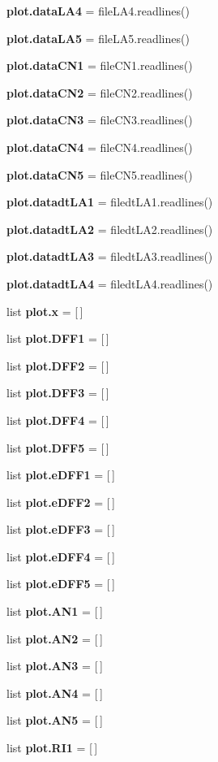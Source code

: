 \begin{DoxyCompactItemize}
\textbf{ plot.\+data\+L\+A4} = file\+L\+A4.\+readlines()
\item 
\textbf{ plot.\+data\+L\+A5} = file\+L\+A5.\+readlines()
\item 
\textbf{ plot.\+data\+C\+N1} = file\+C\+N1.\+readlines()
\item 
\textbf{ plot.\+data\+C\+N2} = file\+C\+N2.\+readlines()
\item 
\textbf{ plot.\+data\+C\+N3} = file\+C\+N3.\+readlines()
\item 
\textbf{ plot.\+data\+C\+N4} = file\+C\+N4.\+readlines()
\item 
\textbf{ plot.\+data\+C\+N5} = file\+C\+N5.\+readlines()
\item 
\textbf{ plot.\+datadt\+L\+A1} = filedt\+L\+A1.\+readlines()
\item 
\textbf{ plot.\+datadt\+L\+A2} = filedt\+L\+A2.\+readlines()
\item 
\textbf{ plot.\+datadt\+L\+A3} = filedt\+L\+A3.\+readlines()
\item 
\textbf{ plot.\+datadt\+L\+A4} = filedt\+L\+A4.\+readlines()
\item 
list \textbf{ plot.\+x} = [$\,$]
\item 
list \textbf{ plot.\+D\+F\+F1} = [$\,$]
\item 
list \textbf{ plot.\+D\+F\+F2} = [$\,$]
\item 
list \textbf{ plot.\+D\+F\+F3} = [$\,$]
\item 
list \textbf{ plot.\+D\+F\+F4} = [$\,$]
\item 
list \textbf{ plot.\+D\+F\+F5} = [$\,$]
\item 
list \textbf{ plot.\+e\+D\+F\+F1} = [$\,$]
\item 
list \textbf{ plot.\+e\+D\+F\+F2} = [$\,$]
\item 
list \textbf{ plot.\+e\+D\+F\+F3} = [$\,$]
\item 
list \textbf{ plot.\+e\+D\+F\+F4} = [$\,$]
\item 
list \textbf{ plot.\+e\+D\+F\+F5} = [$\,$]
\item 
list \textbf{ plot.\+A\+N1} = [$\,$]
\item 
list \textbf{ plot.\+A\+N2} = [$\,$]
\item 
list \textbf{ plot.\+A\+N3} = [$\,$]
\item 
list \textbf{ plot.\+A\+N4} = [$\,$]
\item 
list \textbf{ plot.\+A\+N5} = [$\,$]
\item 
list \textbf{ plot.\+R\+I1} = [$\,$]
\item 

\end{DoxyCompactItemize}
